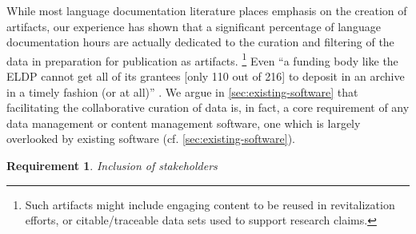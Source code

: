 \documentclass[11pt]{article}
\newtheorem{requirement}{Requirement}
\begin{document}
While most language documentation literature places emphasis on the creation of
artifacts, our experience has shown that a significant percentage of language
documentation hours are actually dedicated to the curation and filtering of the
data in preparation for publication as artifacts.%
\footnote{Such artifacts might include engaging content to be reused in
    revitalization efforts, or citable/traceable data sets used to support
research claims.}
Even ``a funding body like the ELDP cannot get all of its grantees [only 110
out of 216] to deposit in an archive in a timely fashion (or at all)''
\cite{Thieberger:2012}. We argue in \autoref{sec:existing-software} that
facilitating the collaborative curation of data is, in fact, a core requirement
of any data management or content management software, one which is largely
overlooked by existing software (cf.
\autoref{sec:existing-software}).


 
 

\begin{requirement}
	\label{req:inclusive}
       Inclusion of stakeholders
\end{requirement}
\end{document}
